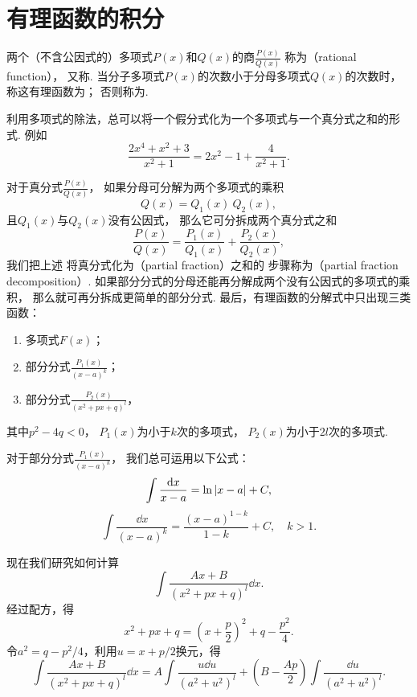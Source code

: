 \section{有理函数的积分}
两个（不含公因式的）多项式\(P(x)\)和\(Q(x)\)的商\(\frac{P(x)}{Q(x)}\)
称为（rational function），
又称.
当分子多项式\(P(x)\)的次数小于分母多项式\(Q(x)\)的次数时，
称这有理函数为；
否则称为.

利用多项式的除法，总可以将一个假分式化为一个多项式与一个真分式之和的形式.
例如\[
	\frac{2x^4+x^2+3}{x^2+1}
	= 2x^2-1+\frac{4}{x^2+1}.
\]

对于真分式\(\frac{P(x)}{Q(x)}\)，
如果分母可分解为两个多项式的乘积\[
	Q(x) = Q_1(x)~Q_2(x),
\]
且\(Q_1(x)\)与\(Q_2(x)\)没有公因式，
那么它可分拆成两个真分式之和\[
	\frac{P(x)}{Q(x)} = \frac{P_1(x)}{Q_1(x)} + \frac{P_2(x)}{Q_2(x)},
\]
我们把上述
将真分式化为（partial fraction）之和的
步骤称为（partial fraction decomposition）.
如果部分分式的分母还能再分解成两个没有公因式的多项式的乘积，
那么就可再分拆成更简单的部分分式.
最后，有理函数的分解式中只出现三类函数：
\begin{enumerate}
	\item 多项式\(F(x)\)；
	\item 部分分式\(\frac{P_1(x)}{(x-a)^k}\)；
	\item 部分分式\(\frac{P_2(x)}{(x^2+px+q)^l}\)，
\end{enumerate}
其中\(p^2-4q<0\)，
\(P_1(x)\)为小于\(k\)次的多项式，
\(P_2(x)\)为小于\(2l\)次的多项式.

对于部分分式\(\frac{P_1(x)}{(x-a)^k}\)，
我们总可运用以下公式：\[
	\int \frac{\dd{x}}{x-a} = \ln\abs{x-a} + C,
\]\[
	\int \frac{\dd{x}}{(x-a)^k} = \frac{(x-a)^{1-k}}{1-k} + C,
	\quad k>1.
\]

现在我们研究如何计算\[
	\int \frac{Ax+B}{(x^2+px+q)^l} \dd{x}.
\]
经过配方，得\[
	x^2+px+q = \left(x+\frac{p}{2}\right)^2 + q-\frac{p^2}{4}.
\]
令\(a^2=q-p^2/4\)，利用\(u=x+p/2\)换元，得\[
	\int \frac{Ax+B}{(x^2+px+q)^l} \dd{x}
	= A \int \frac{u \dd{u}}{(a^2+u^2)^l}
	+ \left(B - \frac{Ap}{2}\right) \int \frac{\dd{u}}{(a^2+u^2)^l}.
\]


